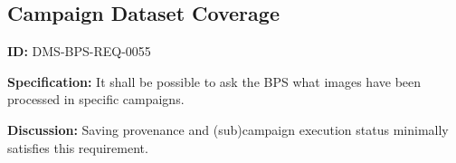 \documentclass[SE,toc,lsstdraft]{lsstdoc}
\newcommand{\addendum}{}
\begin{document}
\subsection{Campaign Dataset Coverage}

\label{DMS-BPS-REQ-0055}
\textbf{ID:} DMS-BPS-REQ-0055

\textbf{Specification:}
It shall be possible to ask the BPS what images have been processed in specific campaigns.

\textbf{Discussion:}
Saving provenance and (sub)campaign execution status minimally satisfies this requirement.

\addendum


\end{document}
